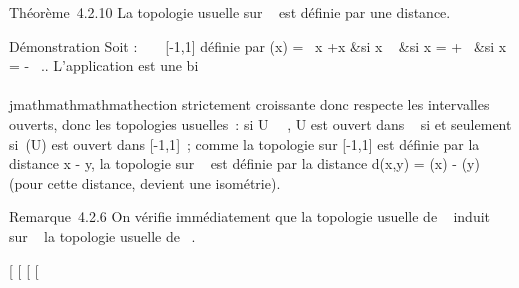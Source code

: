 Théorème~4.2.10 La topologie usuelle sur \overline{}~
est définie par une distance.

Démonstration Soit \phi : \overline{}~ \rightarrow~ {[}-1,1{]}
définie par \phi(x) = \left \
\cases  x +\textbar{}x\textbar{} &si x \in {}~  &si x = +\infty~
\cr -1 &si x = -\infty~ \cr 
\right .. L'application \phi est une bi\\\\jmathmathmathmathection strictement
croissante donc respecte les intervalles ouverts, donc les topologies
usuelles~: si U \subset~\overline{}~, U est ouvert dans
\overline\mathbb{R}~ si et seulement si~\phi(U) est ouvert dans
{[}-1,1{]}~; comme la topologie sur {[}-1,1{]} est définie par la
distance \textbar{}x - y\textbar{}, la topologie sur
\overline{}~ est définie par la distance d(x,y) =
\textbar{}\phi(x) - \phi(y)\textbar{} (pour cette distance, \phi devient une
isométrie).

Remarque~4.2.6 On vérifie immédiatement que la topologie usuelle de
\overline{}~ induit sur ~ la topologie usuelle de \mathbb{R}~.

{[}
{[}
{[}
{[}
